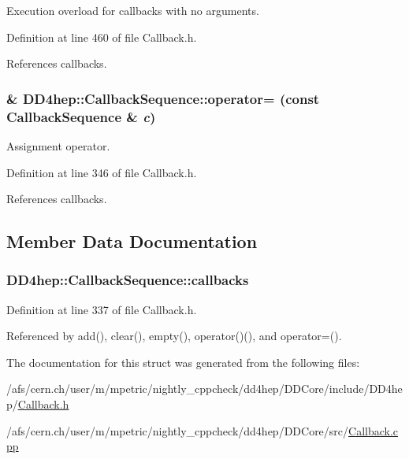 Execution overload for callbacks with no arguments. 

Definition at line 460 of file Callback.h.

References callbacks.\hypertarget{struct_d_d4hep_1_1_callback_sequence_ae72a363494db733a31d47f70564f9ae1}{
\subsubsection[{operator=}]{\& DD4hep::CallbackSequence::operator= (const {\bf CallbackSequence} \& {\em c})}}
\label{struct_d_d4hep_1_1_callback_sequence_ae72a363494db733a31d47f70564f9ae1}


Assignment operator. 

Definition at line 346 of file Callback.h.

References callbacks.

\subsection{Member Data Documentation}
\hypertarget{struct_d_d4hep_1_1_callback_sequence_a76c6c81bd2cd430ca45bde9206fb1839}{
\subsubsection[{callbacks}]{ {\bf DD4hep::CallbackSequence::callbacks}}}
\label{struct_d_d4hep_1_1_callback_sequence_a76c6c81bd2cd430ca45bde9206fb1839}


Definition at line 337 of file Callback.h.

Referenced by add(), clear(), empty(), operator()(), and operator=().

The documentation for this struct was generated from the following files:\begin{DoxyCompactItemize}
\item 
/afs/cern.ch/user/m/mpetric/nightly\_\-cppcheck/dd4hep/DDCore/include/DD4hep/\hyperlink{_callback_8h}{Callback.h}\item 
/afs/cern.ch/user/m/mpetric/nightly\_\-cppcheck/dd4hep/DDCore/src/\hyperlink{_callback_8cpp}{Callback.cpp}\end{DoxyCompactItemize}
